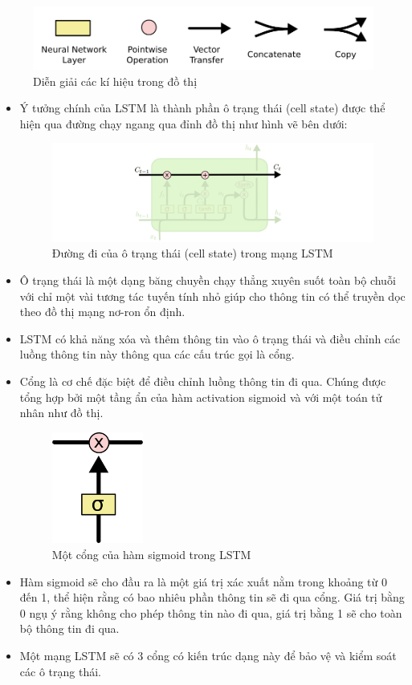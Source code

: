 \begin{figure}[H]
    \centering
    \includegraphics[width=14cm]{Images/Architecture/lstm1.png}
\caption{Diễn giải các kí hiệu trong đồ thị}
\end{figure}

\indent 

\begin{itemize}
    \item Ý tưởng chính của LSTM là thành phần ô trạng thái (cell state) được thể hiện qua đường chạy ngang qua đỉnh đồ thị như hình vẽ bên dưới:
    \begin{figure}[H]
        \centering
        \includegraphics[width=14cm]{Images/Architecture/LSTM3-C-line.png}
    \caption{Đường đi của ô trạng thái (cell state) trong mạng LSTM}
    \end{figure}
    \item Ô trạng thái là một dạng băng chuyền chạy thẳng xuyên suốt toàn bộ chuỗi với chỉ một vài tương tác tuyến tính nhỏ giúp cho thông tin có thể truyền dọc theo đồ thị mạng nơ-ron ổn định.
    \item LSTM có khả năng xóa và thêm thông tin vào ô trạng thái và điều chỉnh các luồng thông tin này thông qua các cấu trúc gọi là cổng.
    \item Cổng là cơ chế đặc biệt để điều chỉnh luồng thông tin đi qua. Chúng được tổng hợp bởi một tầng ẩn của hàm activation sigmoid và với một toán tử nhân như đồ thị.
    \begin{figure}[H]
        \centering
        \includegraphics[width=3cm]{Images/Architecture/LSTM3-gate.png}
    \caption{Một cổng của hàm sigmoid trong LSTM}
    \end{figure}
    \item Hàm sigmoid sẽ cho đầu ra là một giá trị xác xuất nằm trong khoảng từ 0 đến 1, thể hiện rằng có bao nhiêu phần thông tin sẽ đi qua cổng. Giá trị bằng 0 ngụ ý rằng không cho phép thông tin nào đi qua, giá trị bằng 1 sẽ cho toàn bộ thông tin đi qua.
    \item Một mạng LSTM sẽ có 3 cổng có kiến trúc dạng này để bảo vệ và kiểm soát các ô trạng thái.
\end{itemize}


